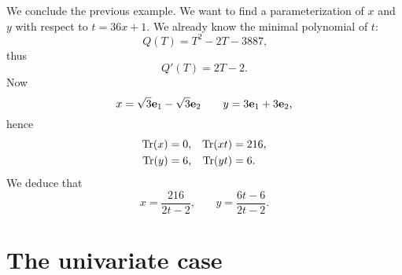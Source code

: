 \begin{example}
  We conclude the previous example. We want to find a parameterization
  of $x$ and $y$ with respect to $t=36x+1$. We already know the
  minimal polynomial of $t$:
  \[Q(T) = T^2-2T-3887\text{,}\]
  thus
  \[Q'(T) = 2T-2\text{.}\]
  Now
  \[x=\sqrt{3}\mathbf{e}_1 -\sqrt{3}\mathbf{e}_2 \qquad
  y = 3\mathbf{e}_1 + 3\mathbf{e}_2\text{,}\]
  hence 
  \begin{align*}
    \operatorname{Tr}(x) &= 0\text{,} & \operatorname{Tr}(xt) &= 216\text{,}\\
    \operatorname{Tr}(y) &= 6\text{,} & \operatorname{Tr}(yt) &= 6\text{.}
  \end{align*}
  We deduce that
  \[x=\frac{216}{2t-2}\text{,}\qquad
  y=\frac{6t-6}{2t-2}\text{.}\]
\end{example}


\section{The univariate case}
\label{sec:univariate-case}




